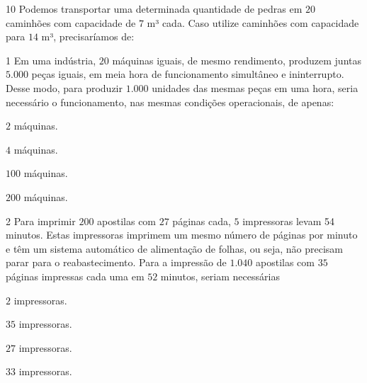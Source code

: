 
\num{10}  Podemos transportar uma determinada quantidade de pedras em $20$
caminhões com capacidade de $7$ m³ cada. Caso utilize caminhões com
capacidade para $14$ m³, precisaríamos de:



\num{1}  Em uma indústria, $20$ máquinas iguais, de mesmo rendimento, produzem
juntas $5.000$ peças iguais, em meia hora de funcionamento simultâneo e
ininterrupto. Desse modo, para produzir $1.000$ unidades das mesmas peças
em uma hora, seria necessário o funcionamento, nas mesmas condições
operacionais, de apenas:

\begin{escolha}
\item $2$ máquinas.
\item $4$ máquinas.
\item $100$ máquinas.
\item $200$ máquinas.
\end{escolha}



\num{2}  Para imprimir $200$ apostilas com $27$ páginas cada, $5$ impressoras levam
54 minutos. Estas impressoras imprimem um mesmo número de páginas por
minuto e têm um sistema automático de alimentação de folhas, ou seja,
não precisam parar para o reabastecimento. Para a impressão de $1.040$
apostilas com $35$ páginas impressas cada uma em $52$ minutos, seriam
necessárias

\begin{escolha}
\item $2$ impressoras.
\item $35$ impressoras.
\item $27$ impressoras.
\item $33$ impressoras.
\end{escolha}

